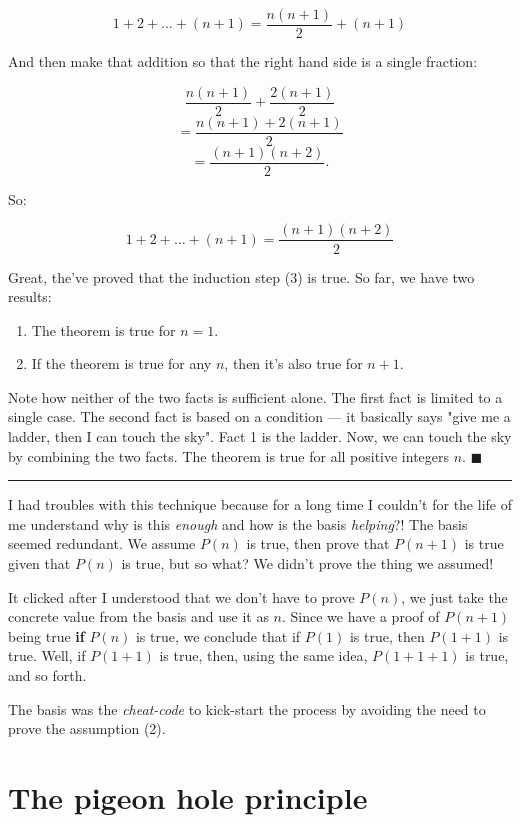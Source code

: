 \documentclass[a4paper, justified, notitlepage, sfsidenotes, notoc]{tufte-book}
\begin{document}
$$ 1 + 2 + \ldots + (n + 1) = \boxed{ \frac{n(n+1)}{2} } + (n+1) $$

And then make that addition so that the right hand side is a single fraction:

$$ \frac{n(n+1)}{2} + \frac{2(n+1)}{2} $$
$$ = \frac{n(n+1) + 2(n+1)}{2} $$
$$ = \frac{(n+1)(n+2)}{2}. $$

So:

\begin{equation}
1 + 2 + \ldots + (n + 1) = \frac{(n+1)(n+2)}{2}
\end{equation}

Great, the've proved that the induction step (3) is true. So far, we have two results:

\begin{enumerate}
\item The theorem is true for \(n=1\).
\item If the theorem is true for any \(n\), then it's also true for \(n+1\).
\end{enumerate}

Note how neither of the two facts is sufficient alone. The first fact is limited to a single case. The second fact is based on a condition — it basically says "give me a ladder, then I can touch the sky". Fact 1 is the ladder. Now, we can touch the sky by combining the two facts. The theorem is true for all positive integers \(n\). \(\blacksquare\)

\noindent\rule{\textwidth}{0.5pt}

I had troubles with this technique because for a long time I couldn't for the life of me understand why is this \emph{enough} and how is the basis \emph{helping}?! The basis seemed redundant. We assume \(P(n)\) is true, then prove that \(P(n+1)\) is true given that \(P(n)\) is true, but so what? We didn't prove the thing we assumed!

It clicked after I understood that we don't have to prove \(P(n)\), we just take the concrete value from the basis and use it as \(n\). Since we have a proof of \(P(n+1)\) being true \textbf{if} \(P(n)\) is true, we conclude that if \(P(1)\) is true, then \(P(1+1)\) is true. Well, if \(P(1+1)\) is true, then, using the same idea, \(P(1+1+1)\) is true, and so forth.

The basis was the \emph{cheat-code} to kick-start the process by avoiding the need to prove the assumption (2).

\section{The pigeon hole principle}
\label{sec:org39cfd5d}
\end{document}

